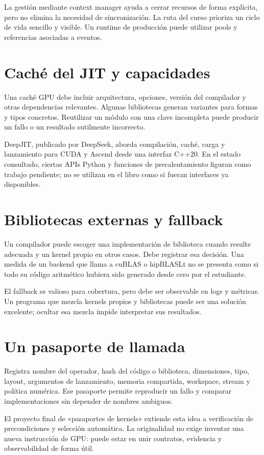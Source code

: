 \documentclass[12pt,a4paper,oneside]{report}
\begin{document}
La gestión mediante context manager ayuda a cerrar recursos de forma explícita, pero no elimina la necesidad de sincronización. La ruta del curso prioriza un ciclo de vida sencillo y visible. Un runtime de producción puede utilizar pools y referencias asociadas a eventos.

\section{Caché del JIT y capacidades}
Una caché GPU debe incluir arquitectura, opciones, versión del compilador y otras dependencias relevantes. Algunas bibliotecas generan variantes para formas y tipos concretos. Reutilizar un módulo con una clave incompleta puede producir un fallo o un resultado sutilmente incorrecto.

DeepJIT, publicado por DeepSeek, aborda compilación, caché, carga y lanzamiento para CUDA y Ascend desde una interfaz C++20. En el estado consultado, ciertas APIs Python y funciones de precalentamiento figuran como trabajo pendiente; no se utilizan en el libro como si fueran interfaces ya disponibles. \cite{deepjit}

\section{Bibliotecas externas y fallback}
Un compilador puede escoger una implementación de biblioteca cuando resulte adecuada y un kernel propio en otros casos. Debe registrar esa decisión. Una medida de un backend que llama a cuBLAS o hipBLASLt no se presenta como si todo su código aritmético hubiera sido generado desde cero por el estudiante.

El fallback es valioso para cobertura, pero debe ser observable en logs y métricas. Un programa que mezcla kernels propios y bibliotecas puede ser una solución excelente; ocultar esa mezcla impide interpretar sus resultados.

\section{Un pasaporte de llamada}
Registra nombre del operador, hash del código o biblioteca, dimensiones, tipo, layout, argumentos de lanzamiento, memoria compartida, workspace, stream y política numérica. Ese pasaporte permite reproducir un fallo y comparar implementaciones sin depender de nombres ambiguos.

El proyecto final de «pasaportes de kernels» extiende esta idea a verificación de precondiciones y selección automática. La originalidad no exige inventar una nueva instrucción de GPU: puede estar en unir contratos, evidencia y observabilidad de forma útil.
\end{document}
